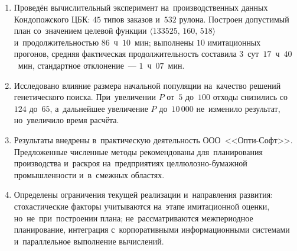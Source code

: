 \begin{enumerate}
  \item Проведён вычислительный эксперимент на~производственных данных Кондопожского ЦБК: $45$ типов заказов и~$532$ рулона. Построен допустимый план со~значением целевой функции $\langle133525,\,160,\,518\rangle$ и~продолжительностью $86$~ч~$10$~мин; выполнены $10$ имитационных прогонов, средняя фактическая продолжительность составила $3$~сут~$17$~ч~$40$~мин, стандартное отклонение~--- $1$~ч~$07$~мин.

  \item Исследовано влияние размера начальной популяции на~качество решений генетического поиска. При~увеличении $P$ от~$5$ до~$100$ отходы снизились со~$124$ до~$65$, а~дальнейшее увеличение $P$ до~$10\,000$ не~изменило результат, но~увеличило время расчёта.

  \item Результаты внедрены в~практическую деятельность ООО~<<Опти-Софт>>. Предложенные численные методы рекомендованы для~планирования производства и~раскроя на~предприятиях целлюлозно-бумажной промышленности и~в~смежных областях.

  \item Определены ограничения текущей реализации и~направления развития: стохастические факторы учитываются на~этапе имитационной оценки, но~не~при~построении плана; не~рассматриваются межпериодное планирование, интеграция с~корпоративными информационными системами и~параллельное выполнение вычислений.
\end{enumerate}